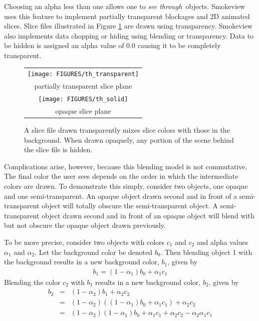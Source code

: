 \documentclass[11pt,twoside]{book}
\begin{document}
Choosing an alpha less than one allows one to {\em see through}\
objects. Smokeview uses this feature to implement partially
transparent blockages and 2D animated slices. Slice files
illustrated in Figure \ref{figtransparent} are drawn using
transparency. Smokeview also implements data chopping or hiding
using blending or transparency.  Data to be hidden is assigned an
alpha value of 0.0 causing it to be completely transparent.

\begin{figure}[\figoptions]
\begin{center}
\begin{tabular}{c}
\texttt{[image: FIGURES/th\_transparent]}\\
partially transparent slice plane\\
\texttt{[image: FIGURES/th\_solid]}\\
opaque slice plane\\
\end{tabular}
\end{center}
\caption {A slice file drawn transparently mixes
slice colors with those in the background.  When drawn opaquely,
any portion of the scene behind the slice file is hidden. }
\label{figtransparent}
\end{figure}

Complications arise, however, because this blending model is not commutative.  The final color the user sees depends on the order in which the intermediate colors are drawn. To demonstrate this simply, consider two objects, one opaque and one semi-transparent.  An opaque object drawn second and in front of a semi-transparent object will totally obscure the semi-transparent object. A semi-transparent object drawn second and in front of an opaque object will blend with but not obscure the opaque object drawn previously.

To be more precise, consider two objects with colors $c_1$ and $c_2$ and alpha values $\alpha_1$ and $\alpha_2$.   Let the background color be denoted $b_0$.  Then blending object 1 with the background results in a new background color, $b_1$, given by
\begin{eqnarray}
b_1=(1-\alpha_1)b_0 + \alpha_1c_1
\end{eqnarray}
Blending the color $c_2$ with $b_1$ results in a new background color, $b_2$, given by
\begin{eqnarray}
b_2&=&(1-\alpha_2)b_1 + \alpha_2c_2\\
&=&(1-\alpha_2)((1-\alpha_1)b_0 + \alpha_1c_1)+\alpha_2c_2\\
&=&(1-\alpha_2)(1-\alpha_1)b_0 + \alpha_1c_1 + \alpha_2c_2 - \alpha_2\alpha_1c_1
\end{eqnarray}
\end{document}
